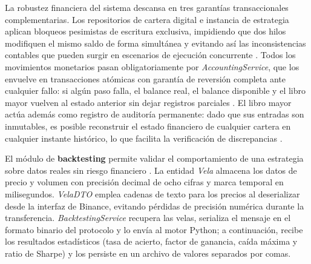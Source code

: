 La robustez financiera del sistema descansa en tres garantías transaccionales complementarias. Los repositorios de cartera digital e instancia de estrategia aplican bloqueos pesimistas de escritura exclusiva, impidiendo que dos hilos modifiquen el mismo saldo de forma simultánea y evitando así las inconsistencias contables que pueden surgir en escenarios de ejecución concurrente \parencite{goetz_java_concurrency_2006,oracle_mysql_acid_2024}. Todos los movimientos monetarios pasan obligatoriamente por \textit{AccountingService}, que los envuelve en transacciones atómicas con garantía de reversión completa ante cualquier fallo: si algún paso falla, el balance real, el balance disponible y el libro mayor vuelven al estado anterior sin dejar registros parciales \parencite{spring_data_jpa_2024,kleppmann_designing_2017}. El libro mayor actúa además como registro de auditoría permanente: dado que sus entradas son inmutables, es posible reconstruir el estado financiero de cualquier cartera en cualquier instante histórico, lo que facilita la verificación de discrepancias \parencite{lopez_de_prado_advances_2018,fowler_patterns_2002}.

El módulo de \textbf{backtesting} permite validar el comportamiento de una estrategia sobre datos reales sin riesgo financiero \parencite{pardo_evaluation_2008}. La entidad \textit{Vela} almacena los datos de precio y volumen con precisión decimal de ocho cifras y marca temporal en milisegundos. \textit{VelaDTO} emplea cadenas de texto para los precios al deserializar desde la interfaz de Binance, evitando pérdidas de precisión numérica durante la transferencia. \textit{BacktestingService} recupera las velas, serializa el mensaje en el formato binario del protocolo y lo envía al motor Python; a continuación, recibe los resultados estadísticos (tasa de acierto, factor de ganancia, caída máxima y ratio de Sharpe) y los persiste en un archivo de valores separados por comas.

